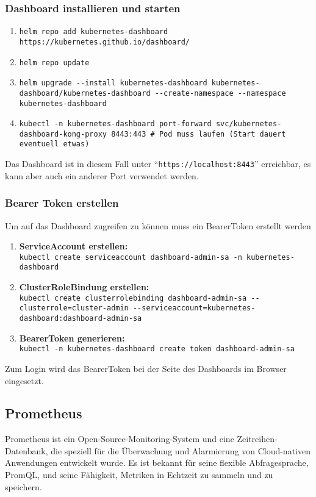 \subsubsection{Dashboard installieren und starten}
\begin{enumerate}
    \item \texttt{helm repo add kubernetes-dashboard https://kubernetes.github.io/dashboard/}
    \item  \texttt{helm repo update}
    \item \texttt{helm upgrade {-}{-}install kubernetes-dashboard kubernetes-dashboard/kubernetes-dashboard {-}{-}create-namespace {-}{-}namespace kubernetes-dashboard}
    \item \texttt{kubectl -n kubernetes-dashboard port-forward svc/kubernetes-dashboard-kong-proxy 8443:443 \# Pod muss laufen (Start dauert eventuell etwas)}
\end{enumerate}
Das Dashboard ist in diesem Fall unter \enquote{\texttt{https://localhost:8443}} erreichbar, es kann aber auch ein anderer Port verwendet werden.
\subsubsection{Bearer Token erstellen}
Um auf das Dashboard zugreifen zu können muss ein BearerToken erstellt werden
\begin{enumerate}
    \item \textbf{ServiceAccount erstellen:}\\ \texttt{kubectl create serviceaccount dashboard-admin-sa -n kubernetes-dashboard}
    \item \textbf{ClusterRoleBindung erstellen:}\\ \texttt{kubectl create clusterrolebinding dashboard-admin-sa {-}{-}clusterrole=cluster-admin {-}{-}serviceaccount=kubernetes-dashboard:dashboard-admin-sa}
    \item \textbf{BearerToken generieren:}\\ \texttt{kubectl -n kubernetes-dashboard create token dashboard-admin-sa}
\end{enumerate}
Zum Login wird das BearerToken bei der Seite des Dashboards im Browser eingesetzt.
\subsection{Prometheus}
Prometheus ist ein Open-Source-Monitoring-System und eine Zeitreihen-Datenbank, die speziell für die Überwachung und Alarmierung von Cloud-nativen Anwendungen entwickelt wurde. Es ist bekannt für seine flexible Abfragesprache, PromQL, und seine Fähigkeit, Metriken in Echtzeit zu sammeln und zu speichern.

